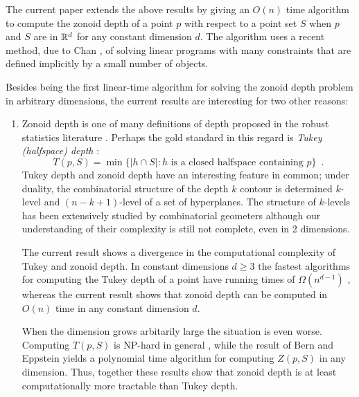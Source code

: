 \documentclass[lotsofwhite]{patmorin}
\begin{document}
The current paper extends the above results by giving an $O(n)$ time
algorithm to compute the zonoid depth of a point $p$ with respect to a
point set $S$ when $p$ and $S$ are in $\mathbb{R}^d$ for any constant
dimension $d$.  The algorithm uses a recent method, due to Chan
\cite{c04}, of solving linear programs with many constraints that are
defined implicitly by a small number of objects.

Besides being the first linear-time algorithm for solving the zonoid
depth problem in arbitrary dimensions, the current results are
interesting for two other reasons:

\begin{enumerate}
\item Zonoid depth is one of many definitions of depth proposed in the
robust statistics literature \cite{lps99}.  Perhaps the gold
standard in this regard is \emph{Tukey (halfspace) depth} \cite{t74}:
\[
      T(p,S) = \min\{ |h\cap S| : \mbox{$h$ is a closed halfspace
containing $p$} \} \enspace .
\]
Tukey depth and zonoid depth have an interesting feature in common;
under duality, the combinatorial structure of the depth $k$ contour is
determined $k$-level and $(n-k+1)$-level of a set of hyperplanes. The
structure of $k$-levels has been extensively studied by combinatorial
geometers \cite[Chapter~11]{mat02} although our understanding of their
complexity is still not complete, even in 2 dimensions.

The current result shows a divergence in the computational complexity
of Tukey and zonoid depth.  In constant dimensions $d\ge 3$ the
fastest algorithms for computing the Tukey depth of a point have
running times of $\Omega(n^{d-1})$ \cite{c05}, whereas the current
result shows that zonoid depth can be computed in $O(n)$ time in any
constant dimension $d$.  

When the dimension grows arbitarily large the situation is even worse.
Computing $T(p,S)$ is NP-hard in general \cite{c94}, while the
result of Bern and Eppstein \cite{be01} yields a polynomial time
algorithm for computing $Z(p,S)$ in any dimension.  Thus, together
these results show that zonoid depth is at least computationally more
tractable than Tukey depth.


\end{enumerate}
\end{document}
